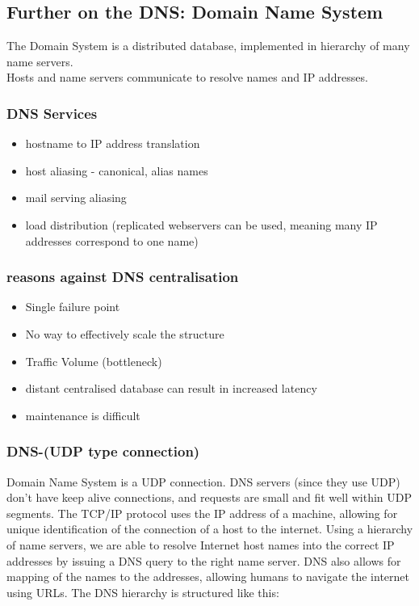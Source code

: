\documentclass{article}
\begin{document}
\subsection{Further on the DNS: Domain Name System}
The Domain System is a distributed database, implemented in hierarchy of many name servers.\\
Hosts and name servers communicate to resolve names and IP addresses.
\subsubsection{DNS Services}
\begin{itemize}
    \item hostname to IP address translation
    \item host aliasing - canonical, alias names
    \item mail serving aliasing
    \item load distribution (replicated webservers can be used, meaning many IP addresses correspond to one name)
\end{itemize}
\subsubsection{reasons against DNS centralisation}
\begin{itemize}
    \item Single failure point
    \item No way to effectively scale the structure
    \item Traffic Volume (bottleneck)
    \item distant centralised database can result in increased latency
    \item maintenance is difficult
\end{itemize}

\subsubsection{DNS-(UDP type connection)}
Domain Name System is a UDP connection. DNS servers (since they use UDP) don't have keep alive connections, and requests are small and fit well within UDP segments. The TCP/IP protocol uses the IP address of a machine, allowing for unique identification of the connection of a host to the internet. Using a hierarchy of name servers, we are able to resolve Internet host names into the correct IP addresses by issuing a DNS query to the right name server. DNS also allows for mapping of the names to the addresses, allowing humans to navigate the internet using URLs. The DNS hierarchy is structured like this:
\end{document}
